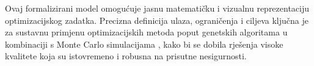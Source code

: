 Ovaj formalizirani model omogućuje jasnu matematičku i vizualnu reprezentaciju optimizacijskog zadatka. Precizna definicija ulaza, ograničenja i ciljeva ključna je za sustavnu primjenu optimizacijskih metoda poput genetskih algoritama \cite{Mitchell1998} u kombinaciji s Monte Carlo simulacijama \cite{Rubinstein2016}, kako bi se dobila rješenja visoke kvalitete koja su istovremeno i robusna na prisutne nesigurnosti.
